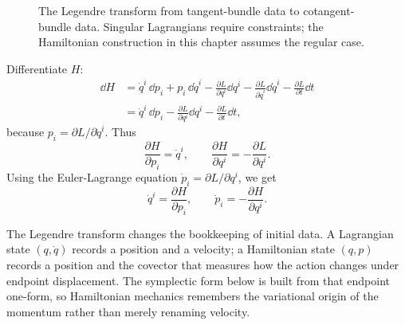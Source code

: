 \begin{figure}[htbp]
\centering
{}
\caption{The Legendre transform from tangent-bundle data to cotangent-bundle
data. Singular Lagrangians require constraints; the Hamiltonian construction in
this chapter assumes the regular case.}
\label{fig:legendre-transform}
\end{figure}

\begin{derivation}
Differentiate \(H\):
\[
\begin{aligned}
  \dd H
  &=
  \dot q^i\,\dd p_i
  +
  p_i\,\dd \dot q^i
  -
  \frac{\partial L}{\partial q^i}\dd q^i
  -
  \frac{\partial L}{\partial \dot q^i}\dd \dot q^i
  -
  \frac{\partial L}{\partial t}\dd t\\
  &=
  \dot q^i\,\dd p_i
  -
  \frac{\partial L}{\partial q^i}\dd q^i
  -
  \frac{\partial L}{\partial t}\dd t,
\end{aligned}
\]
because \(p_i=\partial L/\partial \dot q^i\). Thus
\[
  \frac{\partial H}{\partial p_i}=\dot q^i,
  \qquad
  \frac{\partial H}{\partial q^i}=-\frac{\partial L}{\partial q^i}.
\]
Using the Euler-Lagrange equation \(\dot p_i=\partial L/\partial q^i\), we get
\[
  \boxed{
    \dot q^i=\frac{\partial H}{\partial p_i},
    \qquad
    \dot p_i=-\frac{\partial H}{\partial q^i}
  }.
\]
\end{derivation}

The Legendre transform changes the bookkeeping of initial data. A Lagrangian
state \((q,\dot q)\) records a position and a velocity; a Hamiltonian state
\((q,p)\) records a position and the covector that measures how the action
changes under endpoint displacement. The symplectic form below is built from
that endpoint one-form, so Hamiltonian mechanics remembers the variational
origin of the momentum rather than merely renaming velocity.

